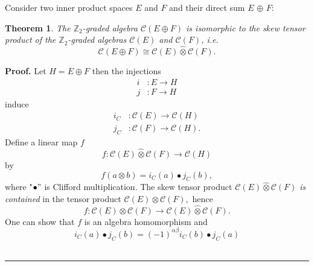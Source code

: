 \documentclass[aps,preprint]{revtex4}%
\newtheorem{theorem}{Theorem}
\newenvironment{proof}[1][Proof]{\noindent\textbf{#1.} }{\ \rule{0.5em}{0.5em}}
\begin{document}
Consider two inner product spaces $E$ and $F$ and their direct sum $E$
$\oplus$ $F:$

\begin{theorem}
The $\mathbb{Z}_{2}$-graded algebra $\mathcal{C}\left(  E\oplus F\right)  $ is
isomorphic to the skew tensor product of the $\mathbb{Z}_{2}$-graded algebras
$\mathcal{C}\left(  E\right)  $ and $\mathcal{C}\left(  F\right)  $, i.e.
\begin{equation}
\mathcal{C}\left(  E\oplus F\right)  \cong\mathcal{C}\left(  E\right)
\widehat{\otimes}\mathcal{C}\left(  F\right)  .
\end{equation}

\end{theorem}

\begin{proof}
Let $H=E\oplus F$ then the injections
\begin{align}
i  &  :E\rightarrow H\\
j  &  :F\rightarrow H
\end{align}
induce%
\begin{align}
i_{C}  &  :\mathcal{C}\left(  E\right)  \rightarrow\mathcal{C}\left(  H\right)
\\
j_{C}  &  :\mathcal{C}\left(  F\right)  \rightarrow\mathcal{C}\left(
H\right)  .
\end{align}
Define a linear map $f$
\begin{equation}
f:\mathcal{C}\left(  E\right)  \widehat{\otimes}\mathcal{C}\left(  F\right)
\rightarrow\mathcal{C}\left(  H\right)
\end{equation}
by
\begin{equation}
f\left(  a\otimes b\right)  =i_{C}\left(  a\right)  \bullet j_{C}\left(
b\right)  ,
\end{equation}
where "$\bullet"$ is Clifford multiplication. The skew tensor product
$\mathcal{C}\left(  E\right)  \widehat{\otimes}\mathcal{C}\left(  F\right)  $
\emph{is contained} in the tensor product $\mathcal{C}\left(  E\right)
\otimes\mathcal{C}\left(  F\right)  ,$ hence
\begin{equation}
f:\mathcal{C}\left(  E\right)  \otimes\mathcal{C}\left(  F\right)
\rightarrow\mathcal{C}\left(  E\right)  \widehat{\otimes}\mathcal{C}\left(
F\right)  .
\end{equation}
One can show that $f$ is an algebra homomorphism and
\begin{equation}
i_{C}\left(  a\right)  \bullet j_{C}\left(  b\right)  =\left(  -1\right)
^{\alpha\beta}i_{C}\left(  b\right)  \bullet j_{C}\left(  a\right)

\end{equation}
\end{proof}
\end{document}
